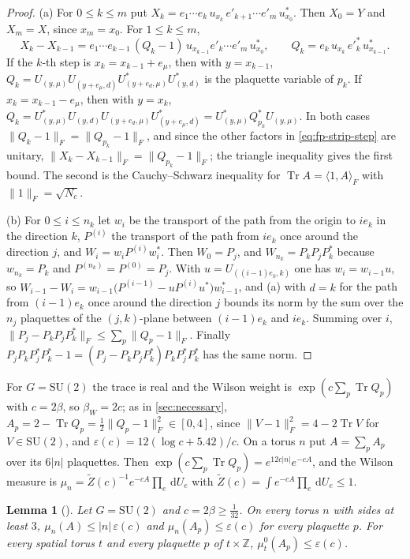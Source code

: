 \documentclass[11pt,a4paper]{amsart}
\newtheorem{lemma}[theorem]{Lemma}
\theoremstyle{definition}
\theoremstyle{remark}
\numberwithin{equation}{section}
\DeclareMathOperator{\Tr}{Tr}        %
\newcommand{\Z}{\mathbb{Z}}          %
\newcommand{\ip}[2]{\langle #1,#2\rangle}  %
\newcommand{\norm}[1]{\lVert #1\rVert}     %
\newcommand{\dd}{\,\mathrm{d}}             %
\newcommand{\SU}{\mathrm{SU}}              %
\newcommand{\betaW}{\beta_{W}}             %
\begin{document}
\begin{proof}
(a) For $0\le k\le m$ put $X_k=e_1\cdots e_k\,u_{x_k}\,e'_{k+1}\cdots e'_m\,u^*_{x_0}$. Then $X_0=Y$ and $X_m=X$, since $x_m=x_0$. For $1\le k\le m$,
\begin{equation}\label{eq:fp-strip-step}
X_k-X_{k-1}=e_1\cdots e_{k-1}\,(Q_k-1)\,u_{x_{k-1}}e'_k\cdots e'_m\,u^*_{x_0},\qquad Q_k=e_k\,u_{x_k}\,e'^{*}_k\,u^*_{x_{k-1}} .
\end{equation}
If the $k$-th step is $x_k=x_{k-1}+e_\mu$, then with $y=x_{k-1}$, $Q_k=U_{(y,\mu)}U_{(y+e_\mu,d)}U^*_{(y+e_d,\mu)}U^*_{(y,d)}$ is the plaquette variable of $p_k$. If $x_k=x_{k-1}-e_\mu$, then with $y=x_k$, $Q_k=U^*_{(y,\mu)}U_{(y,d)}U_{(y+e_d,\mu)}U^*_{(y+e_\mu,d)}=U^*_{(y,\mu)}Q_{p_k}^*U_{(y,\mu)}$. In both cases $\norm{Q_k-1}_F=\norm{Q_{p_k}-1}_F$, and since the other factors in \eqref{eq:fp-strip-step} are unitary, $\norm{X_k-X_{k-1}}_F=\norm{Q_{p_k}-1}_F$; the triangle inequality gives the first bound. The second is the Cauchy--Schwarz inequality for $\Tr A=\ip{1}{A}_F$ with $\norm{1}_F=\sqrt{N_c}$.

(b) For $0\le i\le n_k$ let $w_i$ be the transport of the path from the origin to $ie_k$ in the direction $k$, $P^{(i)}$ the transport of the path from $ie_k$ once around the direction $j$, and $W_i=w_iP^{(i)}w_i^*$. Then $W_0=P_j$, and $W_{n_k}=P_kP_jP_k^*$ because $w_{n_k}=P_k$ and $P^{(n_k)}=P^{(0)}=P_j$. With $u=U_{((i-1)e_k,k)}$ one has $w_i=w_{i-1}u$, so $W_{i-1}-W_i=w_{i-1}\bigl(P^{(i-1)}-uP^{(i)}u^*\bigr)w_{i-1}^*$, and (a) with $d=k$ for the path from $(i-1)e_k$ once around the direction $j$ bounds its norm by the sum over the $n_j$ plaquettes of the $(j,k)$-plane between $(i-1)e_k$ and $ie_k$. Summing over $i$, $\norm{P_j-P_kP_jP_k^*}_F\le\sum_p\norm{Q_p-1}_F$. Finally $P_jP_kP_j^*P_k^*-1=(P_j-P_kP_jP_k^*)P_kP_j^*P_k^*$ has the same norm.
\end{proof}

For $G=\SU(2)$ the trace is real and the Wilson weight is $\exp(c\sum_p\Tr Q_p)$ with $c=2\beta$, so $\betaW=2c$; as in \cref{sec:necessary}, $A_p=2-\Tr Q_p=\frac12\norm{Q_p-1}_F^2\in[0,4]$, since $\norm{V-1}_F^2=4-2\Tr V$ for $V\in\SU(2)$, and $\varepsilon(c)=12(\log c+5.42)/c$. On a torus $n$ put $A=\sum_pA_p$ over its $6|n|$ plaquettes. Then $\exp(c\sum_p\Tr Q_p)=e^{12c|n|}e^{-cA}$, and the Wilson measure is $\mu_n=\tilde Z(c)^{-1}e^{-cA}\prod_e\dd U_e$ with $\tilde Z(c)=\int e^{-cA}\prod_e\dd U_e\le1$.

\begin{lemma}[{\cite[Theorem~8, Step~1]{bhattacharjee2026first}}]\label{lem:fp-energy}
Let $G=\SU(2)$ and $c=2\beta\ge\frac1{32}$. On every torus $n$ with sides at least $3$, $\mu_n(A)\le|n|\,\varepsilon(c)$ and $\mu_n(A_p)\le\varepsilon(c)$ for every plaquette $p$. For every spatial torus $t$ and every plaquette $p$ of $t\times\Z$, $\mu^0_t(A_p)\le\varepsilon(c)$.
\end{lemma}
\end{document}
